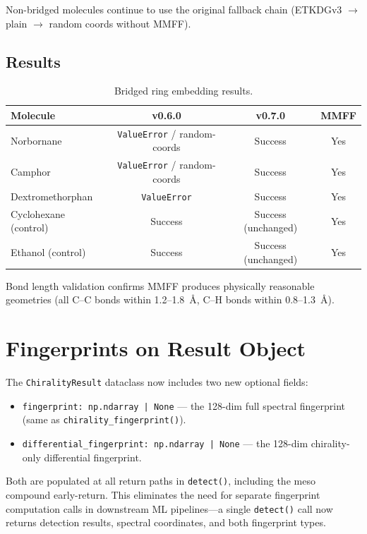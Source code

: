 \documentclass[11pt,a4paper]{article}
\begin{document}
Non-bridged molecules continue to use the original fallback chain (ETKDGv3 $\to$ plain $\to$ random coords without MMFF).

\subsection{Results}

\begin{table}[H]
\centering
\caption{Bridged ring embedding results.}
\label{tab:bridged}
\begin{tabular}{lccc}
\toprule
\textbf{Molecule} & \textbf{v0.6.0} & \textbf{v0.7.0} & \textbf{MMFF} \\
\midrule
Norbornane & \texttt{ValueError} / random-coords & Success & Yes \\
Camphor & \texttt{ValueError} / random-coords & Success & Yes \\
Dextromethorphan & \texttt{ValueError} & Success & Yes \\
Cyclohexane (control) & Success & Success (unchanged) & Yes \\
Ethanol (control) & Success & Success (unchanged) & Yes \\
\bottomrule
\end{tabular}
\end{table}

Bond length validation confirms MMFF produces physically reasonable geometries (all C--C bonds within 1.2--1.8~\AA, C--H bonds within 0.8--1.3~\AA).

\section{Fingerprints on Result Object}

The \texttt{ChiralityResult} dataclass now includes two new optional fields:

\begin{itemize}[leftmargin=*]
    \item \texttt{fingerprint: np.ndarray | None} --- the 128-dim full spectral fingerprint (same as \texttt{chirality\_fingerprint()}).
    \item \texttt{differential\_fingerprint: np.ndarray | None} --- the 128-dim chirality-only differential fingerprint.
\end{itemize}

Both are populated at all return paths in \texttt{detect()}, including the meso compound early-return. This eliminates the need for separate fingerprint computation calls in downstream ML pipelines---a single \texttt{detect()} call now returns detection results, spectral coordinates, and both fingerprint types.
\end{document}
